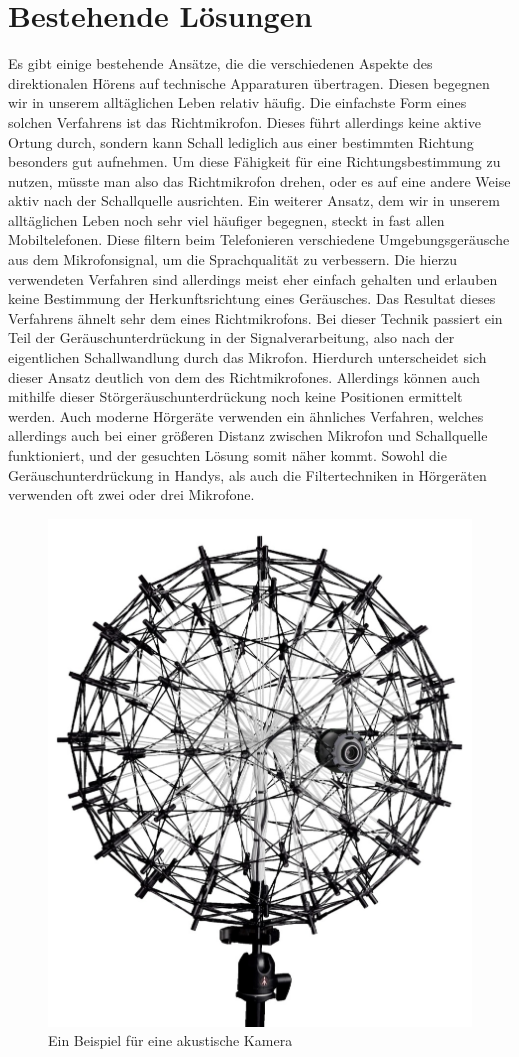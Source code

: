 \section{Bestehende Lösungen}
Es gibt einige bestehende Ansätze, die die verschiedenen Aspekte des direktionalen Hörens auf technische Apparaturen übertragen. Diesen begegnen wir in unserem alltäglichen Leben relativ häufig. Die einfachste Form eines solchen Verfahrens ist das Richtmikrofon. Dieses führt allerdings keine aktive Ortung durch, sondern kann Schall lediglich aus einer bestimmten Richtung besonders gut aufnehmen. Um diese Fähigkeit für eine Richtungsbestimmung zu nutzen, müsste man also das Richtmikrofon drehen, oder es auf eine andere Weise aktiv nach der Schallquelle ausrichten. Ein weiterer Ansatz, dem wir in unserem alltäglichen Leben noch sehr viel häufiger begegnen, steckt in fast allen Mobiltelefonen. Diese filtern beim Telefonieren verschiedene Umgebungsgeräusche aus dem Mikrofonsignal, um die Sprachqualität zu verbessern. Die hierzu verwendeten Verfahren sind allerdings meist eher einfach gehalten und erlauben keine Bestimmung der Herkunftsrichtung eines Geräusches. Das Resultat dieses Verfahrens ähnelt sehr dem eines Richtmikrofons. Bei dieser Technik passiert ein Teil der Geräuschunterdrückung in der Signalverarbeitung, also nach der eigentlichen Schallwandlung durch das Mikrofon. Hierdurch unterscheidet sich dieser Ansatz deutlich von dem des Richtmikrofones. Allerdings können auch mithilfe dieser Störgeräuschunterdrückung noch keine Positionen ermittelt werden. Auch moderne Hörgeräte verwenden ein ähnliches Verfahren, welches allerdings auch bei einer größeren Distanz zwischen Mikrofon und Schallquelle funktioniert, und der gesuchten Lösung somit näher kommt. Sowohl die Geräuschunterdrückung in Handys, als auch die Filtertechniken in Hörgeräten verwenden oft zwei oder drei Mikrofone.\\
     \begin{figure}
     	\centering
        \includegraphics[width=0.5\linewidth]{img/akusticCamera}
     	\caption{Ein Beispiel für eine akustische Kamera \cite{camera}}
     	\label{fig:camera}
     \end{figure}
